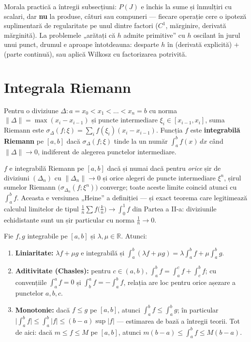 \begin{obs}
Morala practică a întregii subsecțiuni: $P(J)$ e închis la sume și înmulțiri cu scalari, dar \textbf{nu} la produse, câturi sau compuneri --- fiecare operație cere o ipoteză suplimentară de regularitate pe unul dintre factori ($C^1$, mărginire, derivată mărginită). La problemele „arătați că $h$ admite primitive'' cu $h$ oscilant în jurul unui punct, drumul e aproape întotdeauna: desparte $h$ în (derivată explicită) $+$ (parte continuă), sau aplică Wilkosz cu factorizarea potrivită.
\end{obs}

\section{Integrala Riemann}

\begin{definitie}
Pentru o diviziune $\Delta: a=x_0<x_1<\dots<x_n=b$ cu norma $\|\Delta\|=\max(x_i-x_{i-1})$ și puncte intermediare $\xi_i\in[x_{i-1},x_i]$, suma Riemann este $\sigma_\Delta(f;\xi)=\sum_i f(\xi_i)(x_i-x_{i-1})$. Funcția $f$ este \textbf{integrabilă Riemann} pe $[a,b]$ dacă $\sigma_\Delta(f;\xi)$ tinde la un număr $\int_a^b f(x)\,dx$ când $\|\Delta\|\to 0$, indiferent de alegerea punctelor intermediare.
\end{definitie}

\begin{teorema}
$f$ e integrabilă Riemann pe $[a,b]$ dacă și numai dacă pentru \emph{orice} șir de diviziuni $(\Delta_n)$ cu $\|\Delta_n\|\to0$ și orice alegeri de puncte intermediare $\xi^n$, șirul sumelor Riemann $\big(\sigma_{\Delta_n}(f;\xi^n)\big)$ converge; toate aceste limite coincid atunci cu $\int_a^b f$. Aceasta e versiunea „Heine'' a definiției --- și exact teorema care legitimează calculul limitelor de tipul $\frac1n\sum f\big(\frac kn\big)\to\int_0^1f$ din Partea a II-a: diviziunile echidistante sunt un șir particular cu norma $\frac1n\to0$.
\end{teorema}

\begin{teorema}
Fie $f,g$ integrabile pe $[a,b]$ și $\lambda,\mu\in\mathbb{R}$. Atunci:
\begin{enumerate}[leftmargin=*, itemsep=1pt]
\item \textbf{Liniaritate:} $\lambda f+\mu g$ e integrabilă și $\int_a^b(\lambda f+\mu g)=\lambda\int_a^b f+\mu\int_a^b g$.
\item \textbf{Aditivitate (Chasles):} pentru $c\in(a,b)$, $\int_a^b f=\int_a^c f+\int_c^b f$; cu convențiile $\int_a^a f=0$ și $\int_b^a f=-\int_a^b f$, relația are loc pentru orice așezare a punctelor $a,b,c$.
\item \textbf{Monotonie:} dacă $f\le g$ pe $[a,b]$, atunci $\int_a^b f\le\int_a^b g$; în particular $\Big|\int_a^b f\Big|\le\int_a^b|f|\le(b-a)\sup|f|$ --- estimarea de bază a întregii teorii. Tot de aici: dacă $m\le f\le M$ pe $[a,b]$, atunci $m(b-a)\le\int_a^b f\le M(b-a)$.
\end{enumerate}
\end{teorema}

